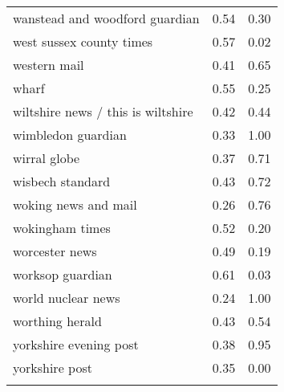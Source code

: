 \begin{longtable}{p{}p{}p{}}
  wanstead and woodford guardian & 0.54 & 0.30 \\ 
  west sussex county times & 0.57 & 0.02 \\ 
  western mail & 0.41 & 0.65 \\ 
  wharf & 0.55 & 0.25 \\ 
  wiltshire news / this is wiltshire & 0.42 & 0.44 \\ 
  wimbledon guardian & 0.33 & 1.00 \\ 
  wirral globe & 0.37 & 0.71 \\ 
  wisbech standard & 0.43 & 0.72 \\ 
  woking news and mail & 0.26 & 0.76 \\ 
  wokingham times & 0.52 & 0.20 \\ 
  worcester news & 0.49 & 0.19 \\ 
  worksop guardian & 0.61 & 0.03 \\ 
  world nuclear news & 0.24 & 1.00 \\ 
  worthing herald & 0.43 & 0.54 \\ 
  yorkshire evening post & 0.38 & 0.95 \\ 
  yorkshire post & 0.35 & 0.00 \\ 
   \hline
\hline
\label{tab:outlet_not_news}
\end{longtable}
\endgroup
